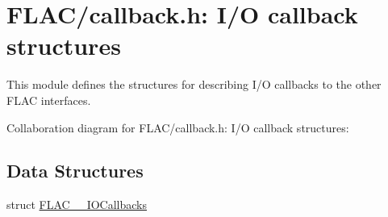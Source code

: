 \hypertarget{group__flac__callbacks}{}\section{F\+L\+A\+C/callback.h\+: I/O callback structures}
\label{group__flac__callbacks}


This module defines the structures for describing I/O callbacks to the other F\+L\+AC interfaces.  


Collaboration diagram for F\+L\+A\+C/callback.h\+: I/O callback structures\+:
\subsection*{Data Structures}
\begin{DoxyCompactItemize}
\item 
struct \hyperlink{struct_f_l_a_c_____i_o_callbacks}{F\+L\+A\+C\+\_\+\+\_\+\+I\+O\+Callbacks}
\end{DoxyCompactItemize}
